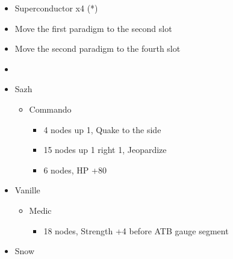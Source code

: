 \begin{paracol}{2}
\begin{upgrade}
\begin{itemize}
\begin{itemize}
\begin{itemize}
\begin{itemize}
						                  \item Superconductor x4 (*)
					                  \end{itemize}
				            \end{itemize}
			      \end{itemize}
		\end{itemize}
	\end{upgrade}
	\switchcolumn*
	\begin{menu}
		\begin{itemize}
			\paradigm
			\begin{itemize}
				\item Move the first paradigm to the second slot
				\item Move the second paradigm to the fourth slot
				\item {}%
				      {\paradigmline{(\syn)}{\sab}{\rav}}%
				      {\paradigmline{\com}{\sab}{\com}}%
				      {\paradigmline{\syn}{\med}{\com}}%
				      {\paradigmline{\com}{\med}{\com}}%
				      {\paradigmline[5]{\textit{\syn}}{\textit{\sab}}{\textit{\com}}}%
				      {\paradigmline{\com}{\rav}{\com}}
			\end{itemize}
			\crystarium
			\begin{itemize}
				\item Sazh
				      \begin{itemize}
					      \item Commando
					            \begin{itemize}
						            \item 4 nodes up 1, Quake to the side
						            \item 15 nodes up 1 right 1, Jeopardize
						            \item 6 nodes, HP +80
					            \end{itemize}
				      \end{itemize}
				\item Vanille
				      \begin{itemize}
					      \item Medic
					            \begin{itemize}
						            \item 18 nodes, Strength +4 before ATB gauge segment
					            \end{itemize}
				      \end{itemize}
				\item Snow
				      \begin{itemize}

\end{itemize}
\end{itemize}
\end{itemize}
\end{menu}
\end{paracol}
